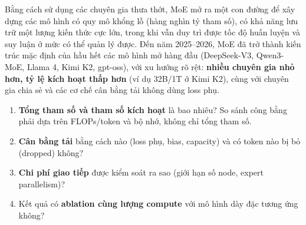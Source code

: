 Bằng cách sử dụng các chuyên gia thưa thớt, MoE mở ra một con đường để xây dựng các mô hình có quy mô khổng lồ (hàng nghìn tỷ tham số), có khả năng lưu trữ một lượng kiến thức cực lớn, trong khi vẫn duy trì được tốc độ huấn luyện và suy luận ở mức có thể quản lý được. Đến năm 2025--2026, MoE đã trở thành kiến trúc mặc định của hầu hết các mô hình mở hàng đầu (DeepSeek-V3, Qwen3-MoE, Llama 4, Kimi K2, gpt-oss), với xu hướng rõ rệt: \textbf{nhiều chuyên gia nhỏ hơn, tỷ lệ kích hoạt thấp hơn} (ví dụ 32B/1T ở Kimi K2), cùng với chuyên gia chia sẻ và các cơ chế cân bằng tải không dùng loss phụ.

\begin{tcolorbox}[title={Đọc paper MoE mới: bốn câu hỏi nên đặt ra}, colback=yellow!10!white, colframe=yellow!50!black, fonttitle=\bfseries]
\begin{enumerate}
	\item \textbf{Tổng tham số và tham số kích hoạt} là bao nhiêu? So sánh công bằng phải dựa trên FLOPs/token và bộ nhớ, không chỉ tổng tham số.
	\item \textbf{Cân bằng tải} bằng cách nào (loss phụ, bias, capacity) và có token nào bị bỏ (dropped) không?
	\item \textbf{Chi phí giao tiếp} được kiểm soát ra sao (giới hạn số node, expert parallelism)?
	\item Kết quả có \textbf{ablation cùng lượng compute} với mô hình dày đặc tương ứng không?
\end{enumerate}
\end{tcolorbox}